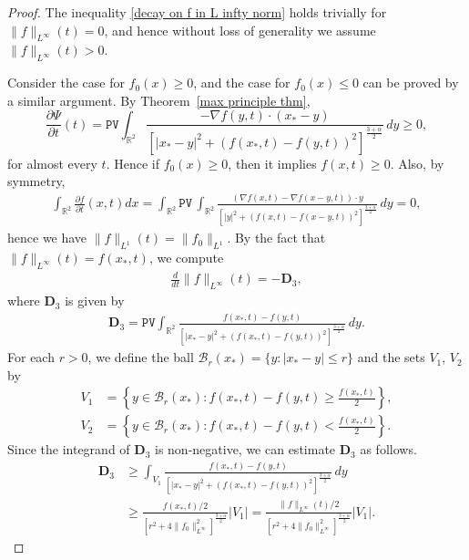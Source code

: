 \documentclass[reqno]{amsart}%
\theoremstyle{definition}
\theoremstyle{remark}
\numberwithin{equation}{section}
\newcommand{\0}{\mathbf{0}}
\newcommand{\1}{\mathbf{1}}
\newcommand{\R}{\mathbb R}
\newcommand{\PV}{\texttt{PV}}
\numberwithin{equation}{section}
\numberwithin{theorem}{section}
\numberwithin{figure}{section}
\begin{document}
\begin{proof}
The inequality \eqref{decay on f in L infty norm} holds trivially for $\|f\|_{L^\infty}(t)=0$, and hence without loss of generality we assume $\|f\|_{L^\infty}(t)>0$. 

Consider the case for $f_0(x)\ge0$, and the case for $f_0(x)\le0$ can be proved by a similar argument. By Theorem~\ref{max principle thm},
\begin{equation*}
\frac{\partial\Psi}{\partial t}(t) = \PV \int_{\mathbb{R}^2} \frac{- \nabla f(y,t) \cdot (x_* - y)}{\left[ |x_* - y|^2 + (f(x_*,t) - f(y,t))^2 \right]^{\frac{3+ \alpha}{2}}} \, dy\ge0,
\end{equation*}
for almost every $t$. Hence if $f_0(x)\ge0$, then it implies $f(x,t)\ge0$. Also, by symmetry, 
\begin{align*}
\int_{\R^2}\frac{\partial f}{\partial t}(x,t)dx = \int_{\R^2} \PV \, \int_{\mathbb{R}^2} \frac{ \left( \nabla f(x,t) - \nabla f(x - y, t) \right) \cdot y }{ \left[ |y|^2 + (f(x,t) - f(x - y, t))^2 \right]^{\frac{3 + \alpha}{2}}} \, dy = 0,
\end{align*}
hence we have $\|f\|_{L^1}(t)=\|f_0\|_{L^1}$. By the fact that $\|f\|_{L^\infty}(t)=f(x_*,t)$, we compute
\begin{align*}
\frac{d}{dt}\|f\|_{L^\infty}(t)=-\mathbf{D}_3,
\end{align*}
where $\mathbf{D}_3$ is given by
\begin{align*}
\mathbf{D}_3=\PV \int_{\mathbb{R}^2} \frac{f(x_*,t) - f(y,t)}{\left[ |x_* - y|^2 + (f(x_*,t) - f(y,t))^2 \right]^{\frac{3+ \alpha}{2}}} \, dy.
\end{align*}
For each $r>0$, we define the ball $\mathcal{B}_r(x_*)=\{y:|x_*-y|\le r\}$ and the sets $V_1$, $V_2$ by
\begin{align*}
V_1 &= \left\{y\in \mathcal{B}_r(x_*): f(x_*,t) - f(y,t) \ge \frac{f(x_*,t)}{2}\right\},\\
V_2 &= \left\{y\in \mathcal{B}_r(x_*): f(x_*,t) - f(y,t) < \frac{f(x_*,t)}{2}\right\}.
\end{align*}
Since the integrand of $\mathbf{D}_3$ is non-negative, we can estimate $\mathbf{D}_3$ as follows.
\begin{align*}
\mathbf{D}_3 &\ge \int_{V_1} \frac{f(x_*,t) - f(y,t)}{\left[ |x_* - y|^2 + (f(x_*,t) - f(y,t))^2 \right]^{\frac{3+ \alpha}{2}}} \, dy\\
&\ge \frac{f(x_*,t)/2}{[r^2+4\|f_0\|^2_{L^\infty}]^\frac{3+\alpha}{2}}|V_1|=\frac{\|f\|_{L^\infty}(t)/2}{[r^2+4\|f_0\|^2_{L^\infty}]^\frac{3+\alpha}{2}}|V_1|.

\end{align*}
\end{proof}
\end{document}

